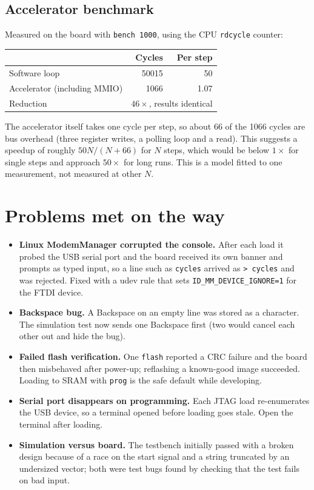 \documentclass[11pt,a4paper]{article}
\begin{document}
\subsection{Accelerator benchmark}
Measured on the board with \texttt{bench 1000}, using the CPU \texttt{rdcycle} counter:
\begin{center}
\begin{tabular}{@{}lrr@{}}\toprule
 & Cycles & Per step\\\midrule
Software loop & 50015 & 50\\
Accelerator (including MMIO) & 1066 & 1.07\\
Reduction & \multicolumn{2}{c}{$46\times$, results identical}\\\bottomrule
\end{tabular}
\end{center}
The accelerator itself takes one cycle per step, so about 66 of the 1066 cycles are bus overhead (three register writes, a polling loop and a read).
This suggests a speedup of roughly $50N/(N+66)$ for $N$ steps, which would be below $1\times$ for single steps and approach $50\times$ for long runs. This is a model fitted to one measurement, not measured at other $N$.

\section{Problems met on the way}
\begin{itemize}
\item \textbf{Linux ModemManager corrupted the console.} After each load it probed the USB serial port and the board received its own banner and prompts as typed input, so a line such as \texttt{cycles} arrived as \texttt{> cycles} and was rejected. Fixed with a udev rule that sets \texttt{ID\_MM\_DEVICE\_IGNORE=1} for the FTDI device.
\item \textbf{Backspace bug.} A Backspace on an empty line was stored as a character. The simulation test now sends one Backspace first (two would cancel each other out and hide the bug).
\item \textbf{Failed flash verification.} One \texttt{flash} reported a CRC failure and the board then misbehaved after power-up; reflashing a known-good image succeeded. Loading to SRAM with \texttt{prog} is the safe default while developing.
\item \textbf{Serial port disappears on programming.} Each JTAG load re-enumerates the USB device, so a terminal opened before loading goes stale. Open the terminal after loading.
\item \textbf{Simulation versus board.} The testbench initially passed with a broken design because of a race on the start signal and a string truncated by an undersized vector; both were test bugs found by checking that the test fails on bad input.
\end{itemize}
\end{document}

